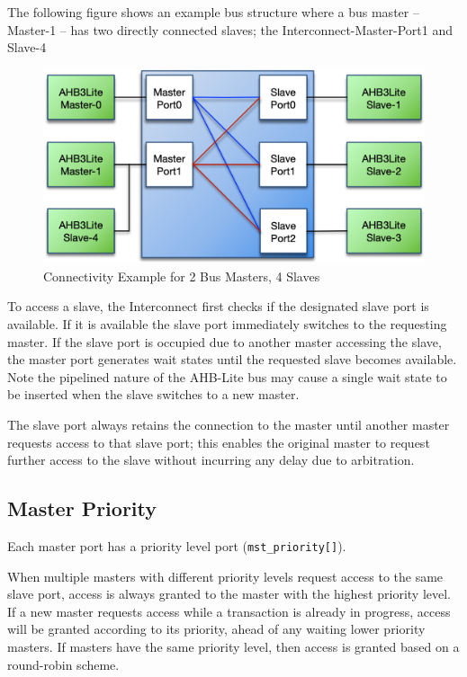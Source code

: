 The following figure shows an example bus structure where a bus master -- Master-1
-- has two directly connected slaves; the Interconnect-Master-Port1 and
Slave-4

\begin{figure}[tbh]
	\centering
	\includegraphics{assets/img/ahb-lite-switch-sys2}
	\caption{Connectivity Example for 2 Bus Masters, 4 Slaves}
	\label{fig:ahb-lite-switch-sys2}
\end{figure}

To access a slave, the Interconnect first checks if the designated slave
port is available. If it is available the slave port immediately
switches to the requesting master. If the slave port is occupied due to
another master accessing the slave, the master port generates wait
states until the requested slave becomes available. Note the pipelined
nature of the AHB-Lite bus may cause a single wait state to be inserted
when the slave switches to a new master.

The slave port always retains the connection to the master until another
master requests access to that slave port; this enables the original
master to request further access to the slave without incurring any
delay due to arbitration.

\subsection{Master Priority}\label{master-priority}

Each master port has a priority level port (\texttt{mst\_priority[]}).

When multiple masters with different priority levels request access to
the same slave port, access is always granted to the master with the
highest priority level. If a new master requests access while a
transaction is already in progress, access will be granted according to
its priority, ahead of any waiting lower priority masters. If masters
have the same priority level, then access is granted based on a
round-robin scheme.

